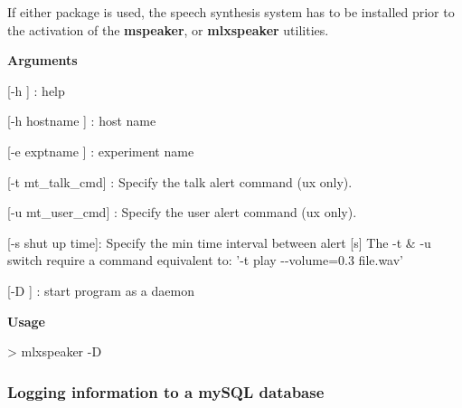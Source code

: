 If either package is used, the speech synthesis system has to be installed prior to the activation of the {\bfseries mspeaker}, or {\bfseries mlxspeaker} utilities.


\begin{DoxyItemize}
\item {\bfseries  Arguments }
\begin{DoxyItemize}
\item \mbox{[}-\/h \mbox{]} : help
\item \mbox{[}-\/h hostname \mbox{]} : host name
\item \mbox{[}-\/e exptname \mbox{]} : experiment name
\item \mbox{[}-\/t mt\_\-talk\_\-cmd\mbox{]} : Specify the talk alert command (ux only).
\item \mbox{[}-\/u mt\_\-user\_\-cmd\mbox{]} : Specify the user alert command (ux only).
\item \mbox{[}-\/s shut up time\mbox{]}: Specify the min time interval between alert \mbox{[}s\mbox{]} The -\/t \& -\/u switch require a command equivalent to: '-\/t play -\/-\/volume=0.3 file.wav'
\item \mbox{[}-\/D \mbox{]} : start program as a daemon
\end{DoxyItemize}
\end{DoxyItemize}


\begin{DoxyItemize}
\item {\bfseries  Usage } 
\begin{DoxyCode}
> mlxspeaker -D
\end{DoxyCode}

\end{DoxyItemize}



\label{index_end}
\hypertarget{index_end}{}
 \subsubsection{Logging information to a mySQL database}\label{F_mySQL}
\label{F_mySQL_idx_Logging_mySQL}
\hypertarget{F_mySQL_idx_Logging_mySQL}{}
 \label{F_mySQL_idx_mySQL}
\hypertarget{F_mySQL_idx_mySQL}{}
 

